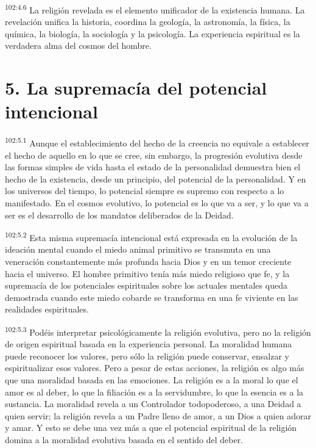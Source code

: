 \par
\textsuperscript{102:4.6} La religión revelada es el elemento unificador de la existencia humana. La revelación unifica la historia, coordina la geología, la astronomía, la física, la química, la biología, la sociología y la psicología. La experiencia espiritual es la verdadera alma del cosmos del hombre.

\section*{5. La supremacía del potencial intencional}
\par
\textsuperscript{102:5.1} Aunque el establecimiento del hecho de la creencia no equivale a establecer el hecho de aquello en lo que se cree, sin embargo, la progresión evolutiva desde las formas simples de vida hasta el estado de la personalidad demuestra bien el hecho de la existencia, desde un principio, del potencial de la personalidad. Y en los universos del tiempo, lo potencial siempre es supremo con respecto a lo manifestado. En el cosmos evolutivo, lo potencial es lo que va a ser, y lo que va a ser es el desarrollo de los mandatos deliberados de la Deidad.

\par
\textsuperscript{102:5.2} Esta misma supremacía intencional está expresada en la evolución de la ideación mental cuando el miedo animal primitivo se transmuta en una veneración constantemente más profunda hacia Dios y en un temor creciente hacia el universo. El hombre primitivo tenía más miedo religioso que fe, y la supremacía de los potenciales espirituales sobre los actuales mentales queda demostrada cuando este miedo cobarde se transforma en una fe viviente en las realidades espirituales.

\par
\textsuperscript{102:5.3} Podéis interpretar psicológicamente la religión evolutiva, pero no la religión de origen espiritual basada en la experiencia personal. La moralidad humana puede reconocer los valores, pero sólo la religión puede conservar, ensalzar y espiritualizar esos valores. Pero a pesar de estas acciones, la religión es algo más que una moralidad basada en las emociones. La religión es a la moral lo que el amor es al deber, lo que la filiación es a la servidumbre, lo que la esencia es a la sustancia. La moralidad revela a un Controlador todopoderoso, a una Deidad a quien servir; la religión revela a un Padre lleno de amor, a un Dios a quien adorar y amar. Y esto se debe una vez más a que el potencial espiritual de la religión domina a la moralidad evolutiva basada en el sentido del deber.

